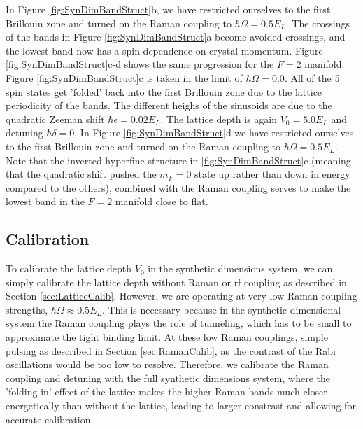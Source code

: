 In Figure \ref{fig:SynDimBandStruct}b, we have restricted ourselves to the first Brillouin zone and turned on the Raman coupling to $\hbar\Omega = 0.5 E_L$. The crossings of the bands in Figure \ref{fig:SynDimBandStruct}a become avoided crossings, and the lowest band now has a spin dependence on crystal momentum. Figure \ref{fig:SynDimBandStruct}c-d shows the same progression for the $F=2$ manifold. Figure \ref{fig:SynDimBandStruct}c is taken in the limit of $\hbar\Omega=0.0$. All of the 5 spin states get 'folded' back into the first Brillouin zone due to the lattice periodicity of the bands. The different heighs of the sinusoids are due to the quadratic Zeeman shift $\hbar\epsilon=0.02 E_L$. The lattice depth is again $V_0=5.0 E_L$ and detuning $\hbar\delta=0$. In Figure \ref{fig:SynDimBandStruct}d we have restricted ourselves to the first Brillouin zone and turned on the Raman coupling to $\hbar\Omega=0.5 E_L$.  Note that the inverted hyperfine structure in \ref{fig:SynDimBandStruct}c (meaning that the quadratic shift pushed the $m_F=0$ state up rather than down in energy compared to the others), combined with the Raman coupling serves to make the lowest band in the $F=2$ manifold close to flat. 


\subsection{Calibration}\label{sec:SynDimCalibration}

To calibrate the lattice depth $V_0$ in the synthetic dimensions system, we can simply calibrate the lattice depth without Raman or rf coupling as described in Section \ref{sec:LatticeCalib}. However, we are operating at very low Raman coupling strengths, $\hbar\Omega\approx0.5 E_L$. This is necessary because in the synthetic dimensional system the Raman coupling plays the role of tunneling, which has to be small to approximate the tight binding limit. At these low Raman couplings, simple pulsing as described in Section \ref{sec:RamanCalib}, as the contrast of the Rabi oscillations would be too low to resolve. Therefore, we calibrate the Raman coupling and detuning with the full synthetic dimensions system, where the 'folding in' effect of the lattice makes the higher Raman bands much closer energetically than without the lattice, leading to larger constrast and allowing for accurate calibration.  

